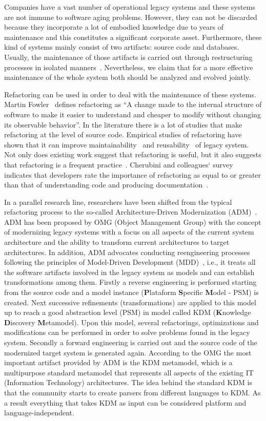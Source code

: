 Companies have a vast number of operational legacy systems and these systems are not immune to software aging problems. However, they can not be discarded because they incorporate a lot of embodied knowledge due to years of maintenance and this constitutes a significant corporate asset. Furthermore, these kind of systems mainly consist of two artifacts: source code and databases. Usually, the maintenance of those artifacts is carried out through restructuring processes in isolated manners~\cite{Moser:2006}. Nevertheless, we claim that for a more effective maintenance of the whole system both should be analyzed and evolved jointly. 

Refactoring can be used in order to deal with the maintenance of these systems. Martin Fowler~\cite{refactImpro} defines refactoring as ``A change made to the internal structure of software to make it easier to understand and cheaper to modify without changing its observable behavior''. In the literature there is a lot of studies that make refactoring at the level of source code. Empirical studies of refactoring have shown that it can improve maintainability~\cite{1510132} and reusability~\cite{Moser:2006} of legacy system. Not only does existing work suggest that refactoring is useful, but it also suggests that refactoring is a frequent practice~\cite{Murphy:2011}. Cherubini and colleagues` survey indicates that developers rate the importance of refactoring as equal to or greater than that of understanding code and producing documentation~\cite{Cherubini:2007}.

In a parallel research line, researchers have been shifted from the typical refactoring process to the so-called Architecture-Driven Modernization (ADM)~\cite{Ulrich:2010}. ADM has been proposed by OMG (Object Management Group) with the concept of modernizing legacy systems with a focus on all aspects of the current system architecture and the ability to transform current architectures to target architectures. In addition, ADM advocates conducting reengineering processes following the principles of Model-Driven Development (MDD)~\cite{Ulrich:2010:IST:1841736}, i.e., it treats all the software artifacts involved in the legacy system as models and can establish transformations among them.  Firstly a reverse engineering is performed starting from the source code and a model instance (\textbf{P}lataform \textbf{S}pecific \textbf{M}odel - PSM) is created. Next successive refinements (transformations) are applied to this model up to reach a good abstraction level (PSM) in model called KDM (\textbf{K}nowledge \textbf{D}iscovery \textbf{M}etamodel). Upon this model, several refactorings, optimizations and modifications can be performed in order to solve problems found in the legacy system. Secondly a forward engineering is carried out and the source code of the modernized target system is generated again. According to the OMG the most important artifact provided by ADM is the KDM metamodel, which is a multipurpose standard metamodel that represents all aspects of the existing IT (Information  Technology) architectures. The idea behind the standard KDM is that the community starts to create parsers from different languages to KDM. As a result everything that takes KDM as input can be considered platform and language-independent.

